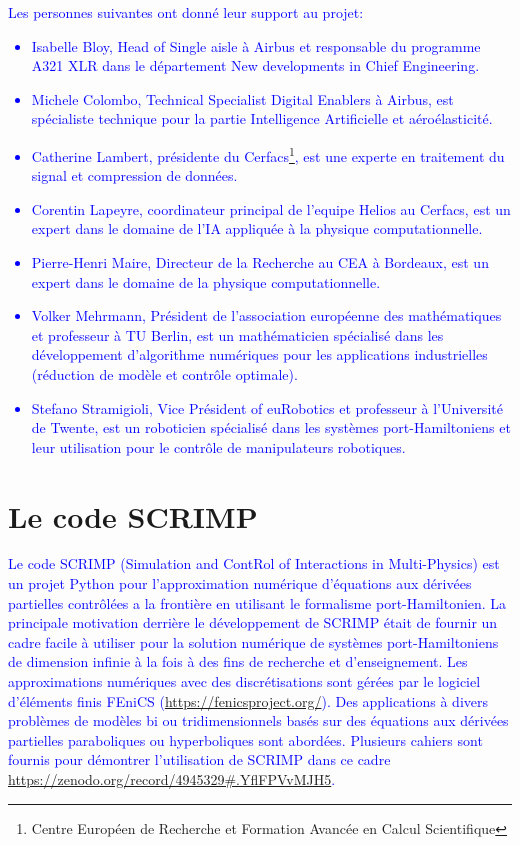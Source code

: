 \documentclass[12pt, french]{article}
\newcommand{\review}[1]{\textcolor{blue}{#1}}
\begin{document}
	\review{
	Les personnes suivantes ont donné leur support au projet:
	\begin{itemize}
		\item Isabelle Bloy, Head of Single aisle  à Airbus et responsable du programme A321 XLR dans le département New developments in Chief Engineering.
		\item Michele Colombo, Technical Specialist Digital Enablers à Airbus, est spécialiste technique pour la partie Intelligence Artificielle et aéroélasticité.
		\item Catherine Lambert, présidente du Cerfacs\footnote{Centre Européen de Recherche et Formation Avancée en Calcul Scientifique}, est une experte en traitement du signal et compression de données. 
		\item Corentin Lapeyre, coordinateur principal de l'equipe Helios au Cerfacs, est un expert dans le domaine de l'IA appliquée à la physique computationnelle.
		\item Pierre-Henri Maire, Directeur de la Recherche au CEA à Bordeaux, est un expert dans le domaine de la physique computationnelle.
		\item Volker Mehrmann, Président de l'association européenne des mathématiques et professeur à TU Berlin, est un mathématicien spécialisé dans les développement d'algorithme numériques pour les applications industrielles (réduction de modèle et contrôle optimale).
		\item Stefano Stramigioli, Vice Président of euRobotics et professeur à l'Université de Twente, est un roboticien spécialisé dans les systèmes port-Hamiltoniens et leur utilisation pour le contrôle de manipulateurs robotiques.
	\end{itemize}
	}
	\section{Le code SCRIMP}\label{sec:SCRIMP}
\review{Le code SCRIMP (Simulation and ContRol of Interactions in Multi-Physics) est un projet Python pour l'approximation numérique d'équations aux dérivées partielles contrôlées a la frontière en utilisant le formalisme port-Hamiltonien. La principale motivation derrière le développement de SCRIMP était de fournir un cadre facile à utiliser pour la solution numérique de systèmes port-Hamiltoniens de dimension infinie à la fois à des fins de recherche et d'enseignement. Les approximations numériques avec des discrétisations sont gérées par le logiciel d'éléments finis FEniCS (\url{https://fenicsproject.org/}). Des applications à divers problèmes de modèles bi ou tridimensionnels basés sur des équations aux dérivées partielles paraboliques ou hyperboliques sont abordées. Plusieurs cahiers sont fournis pour démontrer l'utilisation de SCRIMP dans ce cadre \url{https://zenodo.org/record/4945329\#.YflFPVvMJH5}.}
	
	
	
	
	
\end{document}
